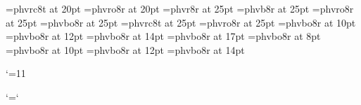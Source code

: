 \font\twtysc=phvrc8t at 20pt
\font\twtysl=phvro8r at 20pt
%
\font\twfvrm=phvr8r at 25pt
\font\twfvbf=phvb8r at 25pt
\font\twfvit=phvro8r at 25pt
\font\twfvbi=phvbo8r at 25pt
\font\twfvsc=phvrc8t at 25pt
\font\twfvsl=phvro8r at 25pt
%
\let\bigfont=\frtrm
\let\Bigfont=\svtrm
\let\BIgfont=\twtyrm
\let\BIGfont=\twfvrm
%
%
\font\ppffsixteen=phvbo8r at 10pt
\font\ppfftwenty=phvbo8r at 12pt
\font\ppfftwentyfour=phvbo8r at 14pt
\font\ppfftwentynine=phvbo8r at 17pt
\font\tinyppff=phvbo8r at 8pt
\font\smallppff=phvbo8r at 10pt
\font\normppff=phvbo8r at 12pt
\font\medppff=phvbo8r at 14pt
%
\def\f{{\ppff f}}
\def\ff{{\ppff ff}}
\def\fp{{\ppff fp}}
\def\fff{{\ppff fff}}
\def\ffff{{\ppff ffff}}
\def\mf{{\ppff mf}}
\def\p{{\ppff p}}
\def\pp{{\ppff pp}}
\def\ppp{{\ppff ppp}}
\def\pppp{{\ppff pppp}}

\edef\catcodeat{\the\catcode`\@}\catcode`\@=11
%
\def\smalldyn{\let\ppff\smallppff \let\p@@f\ppff}%
\def\normdyn{\let\ppff\normppff \let\p@@f\ppff}%
\def\meddyn{\let\ppff\medppff \let\p@@f\ppff}%
%
\def\sF{{\ppff s\p@kern f}}
\def\sfz{{\ppff s\p@kern f\f@kern z}}
\def\sfzp{{\ppff s\p@kern f\f@kern z\p@kern p}}

\def\mp@{{\ppff mp}}
\let\mezzopiano\mp@
\catcode`\@=\catcodeat

\def\smalltype{%
  \let\rm\eightrm
  \let\bf\eightbf
  \let\it\eightit
  \let\bi\eightbi
  \let\sc\eightsc
  \rm}
\def\Smalltype{%
  \let\rm\ninerm
  \let\bf\ninebf
  \let\it\nineit
  \let\bi\ninebi
  \let\sc\ninesc
  \rm}
\def\normtype{%
  \let\rm\tenrm
  \let\bf\tenbf
  \let\it\tenit
  \let\bi\tenbi
  \let\sc\tensc
  \rm}
\def\medtype{%
  \let\rm\twelverm
  \let\bf\twelvebf
  \let\it\twelveit
  \let\bi\twelvebi
  \let\sc\twelvesc
  \rm}
\def\bigtype{%
  \let\rm\bigfont
  \let\bf\bigfont
  \let\it\bigfont
  \let\bi\bigfont
  \let\sc\bigfont
  \sc}
\def\Bigtype{%
  \let\rm\Bigfont
  \let\bf\Bigfont
  \let\it\Bigfont
  \let\bi\Bigfont
  \let\sc\Bigfont
  \sc}
\def\BIgtype{%
  \let\rm\BIgfont
  \let\bf\BIgfont
  \let\it\BIgfont
  \let\bi\Bigfont
  \let\sc\Bigfont
  \sc}
\def\BIGtype{%
  \let\rm\BIGfont
  \let\bf\BIGfont
  \let\it\BIGfont
  \let\bi\BIGfont
  \let\sc\BIGfont
  \sc}
%

\normtype
\endinput
